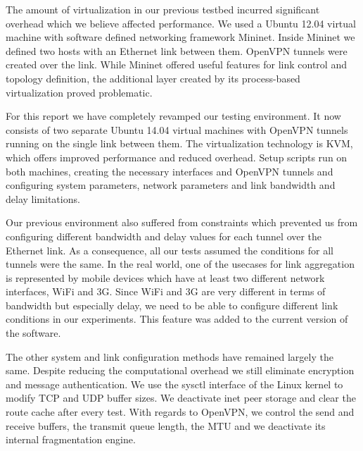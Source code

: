 The amount of virtualization in our previous testbed incurred significant overhead which we believe affected performance. We used a Ubuntu 12.04 virtual machine with software defined networking framework Mininet. Inside Mininet we defined two hosts with an Ethernet link between them. OpenVPN tunnels were created over the link. While Mininet offered useful features for link control and topology definition, the additional layer created by its process-based virtualization proved problematic.

For this report we have completely revamped our testing environment. It now consists of two separate Ubuntu 14.04 virtual machines with OpenVPN tunnels running on the single link between them. The virtualization technology is KVM, which offers improved performance and reduced overhead. Setup scripts run on both machines, creating the necessary interfaces and OpenVPN tunnels and configuring system parameters, network parameters and link bandwidth and delay limitations.

Our previous environment also suffered from constraints which prevented us from configuring different bandwidth and delay values for each tunnel over the Ethernet link. As a consequence, all our tests assumed the conditions for all tunnels were the same. In the real world, one of the usecases for link aggregation is represented by mobile devices which have at least two different network interfaces, WiFi and 3G. Since WiFi and 3G are very different in terms of bandwidth but especially delay, we need to be able to configure different link conditions in our experiments. This feature was added to the current version of the software.

The other system and link configuration methods have remained largely the same. Despite reducing the computational overhead we still eliminate encryption and message authentication. We use the sysctl interface of the Linux kernel to modify TCP and UDP buffer sizes. We deactivate inet peer storage and clear the route cache after every test. With regards to OpenVPN, we control the send and receive buffers, the transmit queue length, the MTU and we deactivate its internal fragmentation engine.

